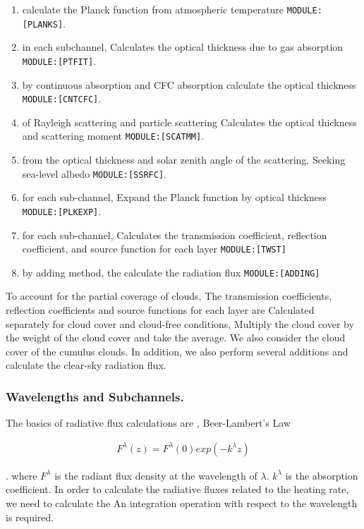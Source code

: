 \begin{enumerate}
\def\labelenumi{\arabic{enumi}.}
\item
  calculate the Planck function from atmospheric temperature
  \texttt{MODULE:{[}PLANKS{]}}.
\item
  in each subchannel, Calculates the optical thickness due to gas
  absorption \texttt{MODULE:{[}PTFIT{]}}.
\item
  by continuous absorption and CFC absorption calculate the optical
  thickness \texttt{MODULE:{[}CNTCFC{]}}.
\item
  of Rayleigh scattering and particle scattering Calculates the optical
  thickness and scattering moment \texttt{MODULE:{[}SCATMM{]}}.
\item
  from the optical thickness and solar zenith angle of the scattering,
  Seeking sea-level albedo \texttt{MODULE:{[}SSRFC{]}}.
\item
  for each sub-channel, Expand the Planck function by optical thickness
  \texttt{MODULE:{[}PLKEXP{]}}.
\item
  for each sub-channel, Calculates the transmission coefficient,
  reflection coefficient, and source function for each layer
  \texttt{MODULE:{[}TWST{]}}
\item
  by adding method, the calculate the radiation flux
  \texttt{MODULE:{[}ADDING{]}}
\end{enumerate}

To account for the partial coverage of clouds, The transmission
coefficients, reflection coefficients and source functions for each
layer are Calculated separately for cloud cover and cloud-free
conditions, Multiply the cloud cover by the weight of the cloud cover
and take the average. We also consider the cloud cover of the cumulus
clouds. In addition, we also perform several additions and calculate the
clear-sky radiation flux.

\hypertarget{wavelengths-and-subchannels.}{%
\subsubsection{Wavelengths and
Subchannels.}\label{wavelengths-and-subchannels.}}

The basics of radiative flux calculations are , Beer-Lambert's Law

\begin{eqnarray}
  F^\lambda(z) = F^\lambda(0) exp (-k^\lambda z)
\end{eqnarray}

. where \(F^\lambda\) is the radiant flux density at the wavelength of
\(\lambda\). \(k^\lambda\) is the absorption coefficient. In order to
calculate the radiative fluxes related to the heating rate, we need to
calculate the An integration operation with respect to the wavelength is
required.

